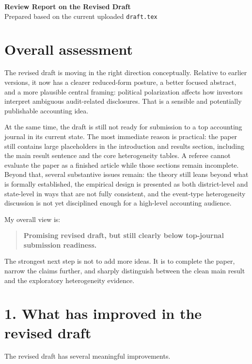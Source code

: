 \documentclass[11pt]{article}
\begin{document}
\begin{center}
{\Large \textbf{Review Report on the Revised Draft}}\\[0.4em]
{\normalsize Prepared based on the current uploaded \texttt{draft.tex}}
\end{center}

\section*{Overall assessment}

The revised draft is moving in the right direction conceptually. Relative to earlier versions, it now has a clearer reduced-form posture, a better focused abstract, and a more plausible central framing: political polarization affects how investors interpret ambiguous audit-related disclosures. That is a sensible and potentially publishable accounting idea.

At the same time, the draft is still not ready for submission to a top accounting journal in its current state. The most immediate reason is practical: the paper still contains large placeholders in the introduction and results section, including the main result sentence and the core heterogeneity tables. A referee cannot evaluate the paper as a finished article while those sections remain incomplete. Beyond that, several substantive issues remain: the theory still leans beyond what is formally established, the empirical design is presented as both district-level and state-level in ways that are not fully consistent, and the event-type heterogeneity discussion is not yet disciplined enough for a high-level accounting audience.

My overall view is:

\begin{quote}
\textbf{Promising revised draft, but still clearly below top-journal submission readiness.}
\end{quote}

The strongest next step is not to add more ideas. It is to complete the paper, narrow the claims further, and sharply distinguish between the clean main result and the exploratory heterogeneity evidence.

\section*{1. What has improved in the revised draft}

The revised draft has several meaningful improvements.
\end{document}
